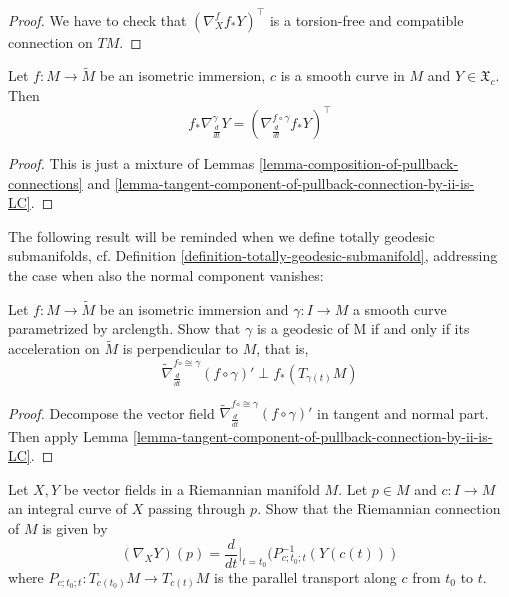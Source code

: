 \begin{proof}
We have to check that $(\nabla^f_Xf_*Y)^\top$ is a torsion-free and compatible
connection on $TM$.
\end{proof}

\begin{lemma}
\label{lemma-isometric-immersion-along-curve}
Let $f:M \to \tilde{M}$ be an isometric immersion, $c$ is a smooth curve in $M$
and $Y\in\mathfrak{X}_c$. Then
$$
f_*\nabla_{\frac{d}{dt}}^\gamma Y
=\left(\nabla^{f\circ\gamma}_{\frac{d}{dt}}f_*Y\right)^\top
$$
\end{lemma}

\begin{proof}
This is just a mixture of Lemmas \ref{lemma-composition-of-pullback-connections}
 and \ref{lemma-tangent-component-of-pullback-connection-by-ii-is-LC}.
\end{proof}

The following result will be reminded when we define totally geodesic
submanifolds, cf. Definition \ref{definition-totally-geodesic-submanifold},
addressing the case when also the normal component vanishes:

\begin{lemma}
\label{lemma-geodesics-of-submanifold-characterization}
Let $f:M \to \tilde{M}$ be an isometric immersion and $\gamma:I\to M$ a smooth
curve parametrized by arclength. Show that $\gamma$ is a geodesic of M
if and only if its acceleration on $\tilde{M}$ is perpendicular to $M$, that is,
$$
\tilde{\nabla}^{f\circ\cong\gamma}_{\frac{d}{dt}}(f\circ\gamma)'\perp
f_*(T_{\gamma(t)}M)
$$
\end{lemma}

\begin{proof}
Decompose the vector field 
$\tilde{\nabla}^{f\circ\cong\gamma}_{\frac{d}{dt}}(f\circ\gamma)'$ in tangent and
normal part. Then apply Lemma 
\ref{lemma-tangent-component-of-pullback-connection-by-ii-is-LC}.
\end{proof}

\begin{exercise}
\label{exercise-parallel-transport-determines-connection}
\begin{reference}
\cite[Chapter II, Exercise 2]{doc}
\end{reference}
Let $X,Y$ be vector fields in a Riemannian manifold $M$.
Let $p \in M$ and $c:I \to M$ an integral curve of $X$ passing through $p$.
Show that the Riemannian connection of $M$ is given by
$$
(\nabla_XY)(p)
=\frac{d}{dt}\Big|_{t=t_0}
(P^{-1}_{c;t_0;t}(Y(c(t)))
$$
where $P_{c;t_0;t}:T_{c(t_0)}M \to T_{c(t)}M$
is the parallel transport along $c$ from $t_0$ to $t$.
\end{exercise}

